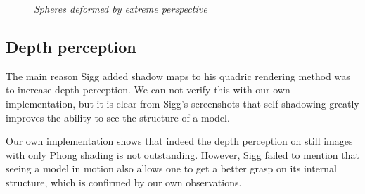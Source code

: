 \begin{figure}[!ht]
\centering
{}
\caption{\em Spheres deformed by extreme perspective}
\label{f:perspective}
\end{figure}

\subsection*{Depth perception}

The main reason Sigg added shadow maps to his quadric rendering method was to increase depth perception.
We can not verify this with our own implementation, but it is clear from Sigg's screenshots that self-shadowing greatly improves the ability to see the structure of a model.

Our own implementation shows that indeed the depth perception on still images with only Phong shading is not outstanding.
However, Sigg failed to mention that seeing a model in motion also allows one to get a better grasp on its internal structure, 
which is confirmed by our own observations.

